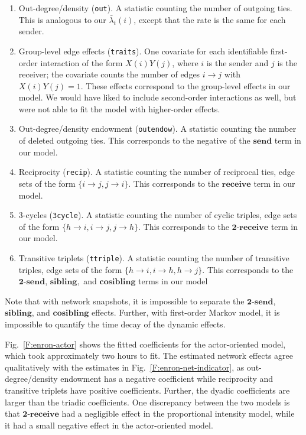 \documentclass[final]{statsoc}
\begin{document}
\begin{enumerate}
  \item Out-degree/density (\texttt{out}). A statistic counting the number
of outgoing ties.  This is analogous to our $\bar \lambda_t(i)$, except that
the rate is the same for each sender.

  \item Group-level edge effects (\texttt{traits}).  One covariate for each
identifiable first-order interaction of the form $X(i) Y(j)$, where $i$ is the
sender and $j$ is the receiver; the covariate counts the number of edges $i
\to j$ with $X(i) Y(j) = 1$.  These effects correspond to the group-level
effects in our model.  We would have liked to include second-order
interactions as well, but were not able to fit the model with higher-order
effects.

  \item Out-degree/density endowment (\texttt{outendow}).  A statistic
counting the number of deleted outgoing ties.  This corresponds to the
negative of the $\textbf{send}$ term in our model.

  \item Reciprocity (\texttt{recip}).  A statistic counting the number of
    reciprocal ties, edge sets of the form $\{ i \to j, j \to i \}$.  This
corresponds to the $\textbf{receive}$ term in our model.

  \item 3-cycles (\texttt{3cycle}).  A statistic counting the number of cyclic
triples, edge sets of the form $\{ h \to i, i \to j, j \to h\}$.  This
corresponds to the $\textbf{2-receive}$ term in our model.

  \item Transitive triplets (\texttt{ttriple}).  A statistic counting the
number of transitive triples, edge sets of the form $\{ h \to i, i \to h, h
\to j \}$.  This corresponds to the $\textbf{2-send}$, $\textbf{sibling},$
and $\textbf{cosibling}$ terms in our model

\end{enumerate}

\noindent
Note that with network snapshots, it is impossible to separate the
$\textbf{2-send}$, $\textbf{sibling}$, and $\textbf{cosibling}$ effects.
Further, with first-order Markov model, it is impossible to quantify the time
decay of the dynamic effects.

Fig.~\ref{F:enron-actor} shows the fitted coefficients for the
actor-oriented model, which took approximately two hours to fit.
The estimated network effects agree
qualitatively with the estimates in Fig.~\ref{F:enron-net-indicator}, as
out-degree/density endowment has a negative coefficient while reciprocity and
transitive triplets have positive coefficients.  Further, the dyadic
coefficients are larger than the triadic coefficients.  One discrepancy
between the two models is that $\textbf{2-receive}$ had a negligible effect in
the proportional intensity model, while it had a small negative effect in the
actor-oriented model.
\end{document}
